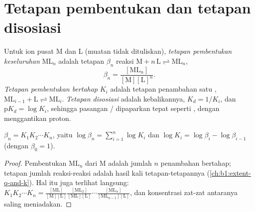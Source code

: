\section{Tetapan pembentukan dan tetapan disosiasi}

\begin{definition}\label{def:b1:complexation:formation-constant}
Untuk ion pusat M dan  L (muatan tidak dituliskan), \emph{tetapan
pembentukan keseluruhan}
$\mathrm{ML}_n$ adalah tetapan $\beta_n$ reaksi
$\mathrm{M} + n\,\mathrm{L} \rightleftharpoons \mathrm{ML}_n$,
\[
  \beta_n = \frac{[\mathrm{ML}_n]}{[\mathrm{M}][\mathrm{L}]^n} .
\]
\emph{Tetapan pembentukan bertahap}
$K_i$ adalah tetapan penambahan satu ,
$\mathrm{ML}_{i-1} + \mathrm{L} \rightleftharpoons \mathrm{ML}_i$.
\emph{Tetapan disosiasi} adalah kebalikannya,
$K_d = 1/K_i$, dan $\mathrm{p}K_d = \log K_i$, sehingga pasangan
/ dipaparkan tepat seperti , dengan
 menggantikan proton.
\end{definition}

\begin{proposition}\label{prop:b1:complexation:beta-k}
$\beta_n = K_1 K_2 \cdots K_n$, yaitu
$\log\beta_n = \sum_{i=1}^n \log K_i$ dan $\log K_i = \log\beta_i -
\log\beta_{i-1}$ (dengan $\beta_0 = 1$).
\end{proposition}

\begin{proof}
Pembentukan $\mathrm{ML}_n$ dari M adalah jumlah $n$ penambahan bertahap;
tetapan jumlah reaksi-reaksi adalah hasil kali tetapan-tetapannya
(\cref{ch:b1:extent-q-and-k}). Hal itu juga terlihat langsung:
$K_1 K_2\cdots K_n = \frac{[\mathrm{ML}]}{[\mathrm{M}][\mathrm{L}]}
\frac{[\mathrm{ML_2}]}{[\mathrm{ML}][\mathrm{L}]}\cdots
\frac{[\mathrm{ML}_n]}{[\mathrm{ML}_{n-1}][\mathrm{L}]}$, dan
konsentrasi zat-zat antaranya saling meniadakan.
\end{proof}

